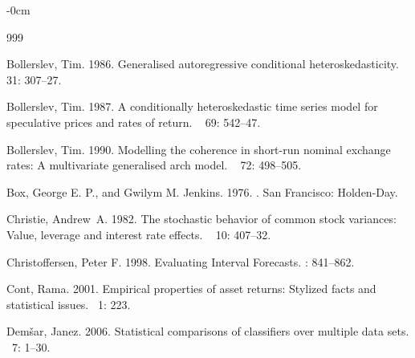 \documentclass[risks,article,accept,pdftex,moreauthors]{Definitions/mdpi}
\begin{document}
\begin{adjustwidth}{-\extralength}{0cm}
\begin{thebibliography}{999}
  
Bollerslev, Tim. 1986.
\newblock Generalised autoregressive conditional heteroskedasticity.
~{ 31\/}: 307--27.

Bollerslev, Tim. 1987.
\newblock A conditionally heteroskedastic time series model for speculative
  prices and rates of return.
~{ 69\/}:
  542--47.

Bollerslev, Tim. 1990.
\newblock Modelling the coherence in short-run nominal exchange rates: A
  multivariate generalised arch model.
~{ 72\/}: {498--505.} %


Box, George E. P., and Gwilym M. Jenkins. 1976.
.
\newblock San Francisco: Holden-Day. %

Christie, Andrew~A. 1982.
\newblock The stochastic behavior of common stock variances: Value, leverage
  and interest rate effects.
~{ 10\/}: 407--32.

Christoffersen, Peter F. 1998. 
\newblock  Evaluating Interval Forecasts. 
: 841--862.

Cont, Rama. 2001.
\newblock Empirical properties of asset returns: Stylized facts and statistical
  issues.
~{1\/}: 223.

Dem{\v{s}}ar, Janez. 2006.
\newblock Statistical comparisons of classifiers over multiple data sets.
~{7\/}: 1--30.


\end{thebibliography}
\end{adjustwidth}
\end{document}
